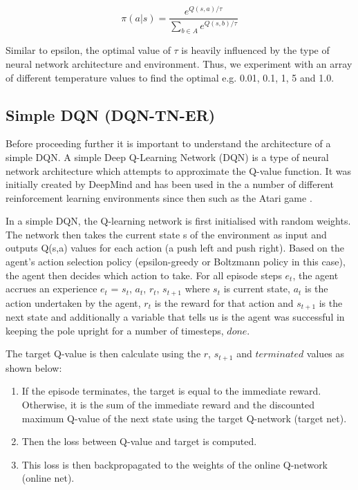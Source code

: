 \documentclass{article}
\begin{document}
\begin{equation}\label{eu_eqn}
\pi(a|s)= \frac{e^{Q(s,a)/\tau}}{\sum_{b\in A}^{}e^{Q(s,b)/\tau}}
\end{equation}

Similar to epsilon, the optimal value of $\tau$ is heavily influenced by the type of neural network architecture and environment. Thus, we experiment with an array of different temperature values to find the optimal e.g. 0.01, 0.1, 1, 5 and 1.0. 

\subsection{Simple DQN (DQN-TN-ER)}
Before proceeding further it is important to understand the architecture of a simple DQN. A simple Deep Q-Learning Network (DQN) is a type of neural network architecture which attempts to approximate the Q-value function. It was initially created by DeepMind and has been used in the a number of different reinforcement learning environments since then such as the Atari game \citep{deepmind}.

In a simple DQN, the Q-learning network is first initialised with random weights. The network then takes the current state s of the environment as input and outputs Q(s,a) values for each action (a push left and push right). Based on the agent's action selection policy (epsilon-greedy or Boltzmann policy in this case), the agent then decides which action to take. For all episode steps $e_t$, the agent accrues an experience  $e_t$ = $s_t$, $a_t$, $r_t$, $s_{t+1}$ where $s_t$ is current state, $a_t$ is the action undertaken by the agent, $r_t$ is the reward for that action and $s_{t+1}$ is the next state and additionally a variable that tells us is the agent was successful in keeping the pole upright for a number of timesteps, $done$.  

The target Q-value is then calculate using the $r$, $s_{t+1}$ and $terminated$ values as shown below: 
\vspace{-10pt}
\begin{enumerate}[itemsep=0pt, parsep=6pt]
    \item If the episode terminates, the target is equal to the immediate reward. Otherwise, it is the sum of the immediate reward and the discounted maximum Q-value of the next state using the target Q-network (target net).
    \item Then the loss between Q-value and target is computed.
    \item This loss is then backpropagated to the weights of the online Q-network (online net). 
\end{enumerate}
\end{document}
